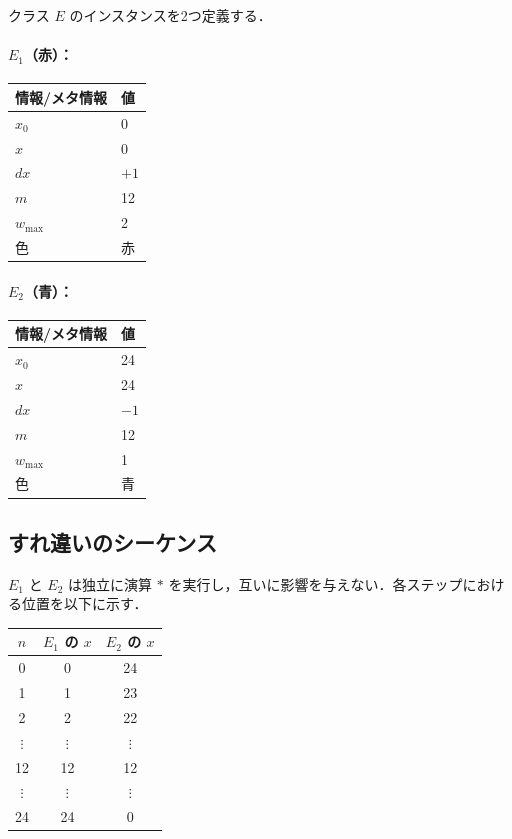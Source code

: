 \documentclass[12pt,a4paper]{ltjsarticle}
\begin{document}
クラス $E$ のインスタンスを2つ定義する．

\paragraph{$E_1$（赤）：}

\begin{table}[h]
\centering
\begin{tabular}{ll}
\toprule
情報/メタ情報 & 値 \\
\midrule
$x_0$         & 0 \\
$x$           & 0 \\
$dx$          & $+1$ \\
$m$           & 12 \\
$w_{\max}$    & 2 \\
色            & 赤 \\
\bottomrule
\end{tabular}
\end{table}

\paragraph{$E_2$（青）：}

\begin{table}[h]
\centering
\begin{tabular}{ll}
\toprule
情報/メタ情報 & 値 \\
\midrule
$x_0$         & 24 \\
$x$           & 24 \\
$dx$          & $-1$ \\
$m$           & 12 \\
$w_{\max}$    & 1 \\
色            & 青 \\
\bottomrule
\end{tabular}
\end{table}

\subsection{すれ違いのシーケンス}

$E_1$ と $E_2$ は独立に演算 $*$ を実行し，互いに影響を与えない．各ステップにおける位置を以下に示す．

\begin{table}[h]
\centering
\begin{tabular}{ccc}
\toprule
$n$ & $E_1$ の $x$ & $E_2$ の $x$ \\
\midrule
0       & 0       & 24 \\
1       & 1       & 23 \\
2       & 2       & 22 \\
$\vdots$ & $\vdots$ & $\vdots$ \\
12      & 12      & 12 \\
$\vdots$ & $\vdots$ & $\vdots$ \\
24      & 24      & 0 \\
\bottomrule
\end{tabular}
\end{table}
\end{document}
